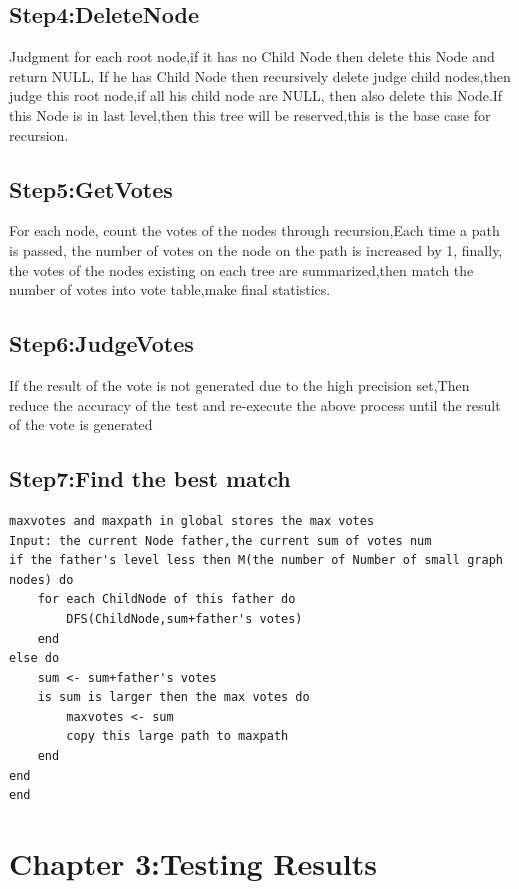 \documentclass[12pt]{article}
\begin{document}
\subsection*{Step4:DeleteNode}
Judgment for each root node,if it has no Child Node then delete this Node and return NULL,
If he has Child Node then recursively delete judge child nodes,then judge this root node,if all his child node are NULL,
then also delete this Node.If this Node is in last level,then this tree will be reserved,this is the base case for recursion.


\subsection*{Step5:GetVotes}
For each node, count the votes of the nodes through recursion,Each time a path is passed, the number of votes on the node on the path is increased by 1,
finally, the votes of the nodes existing on each tree are summarized,then  match the number of votes into vote table,make final statistics.

\subsection*{Step6:JudgeVotes}
If the result of the vote is not generated due to the high precision set,Then reduce the accuracy of the test and re-execute the above process until the result of the vote is generated

\subsection*{Step7:Find the best match}
\begin{lstlisting}
maxvotes and maxpath in global stores the max votes
Input: the current Node father,the current sum of votes num
if the father's level less then M(the number of Number of small graph nodes) do
    for each ChildNode of this father do
        DFS(ChildNode,sum+father's votes)
    end
else do
    sum <- sum+father's votes
    is sum is larger then the max votes do
        maxvotes <- sum
        copy this large path to maxpath
    end 
end
end
\end{lstlisting}
\section*{Chapter 3:Testing Results}
\end{document}
